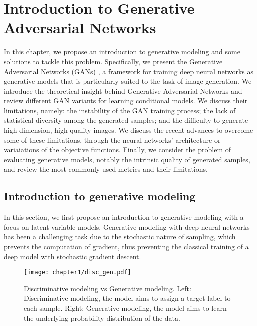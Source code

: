 \chapter{Introduction to Generative Adversarial Networks }
\label{chap:chapter1}

\begin{chapterabstract}
	In this chapter, we propose an introduction to generative modeling and some solutions to tackle this problem. Specifically, we present the Generative Adversarial Networks (\ac{GANs}) \citep{Goodfellow2014}, a framework for training deep neural networks as generative models that is particularly suited to the task of image generation. We introduce the theoretical insight behind Generative Adversarial Networks and review different \ac{GAN} variants for learning conditional models. We discuss their limitations, namely: the instability of the \ac{GAN} training process; the lack of statistical diversity among the generated samples; and the difficulty to generate high-dimension, high-quality images. We discuss the recent advances to overcome some of these limitations, through the neural networks' architecture or variaiations of the objective functions. Finally,  we consider the problem of evaluating generative models, notably the intrinsic quality of generated samples, and review the most commonly used metrics and their limitations. 
\end{chapterabstract}

\clearpage\minitoc


\section{Introduction to generative modeling}

In this section, we first propose an introduction to generative modeling with a focus on latent variable models.  Generative modeling with deep neural networks has been a challenging task due to the stochastic nature of sampling, which prevents the computation of gradient, thus preventing the classical training of a deep model with stochastic gradient descent. 

\begin{figure}
	\centering
	\texttt{[image: chapter1/disc\_gen.pdf]}
	\caption[Generative modeling]{Discriminative modeling vs Generative modeling. Left: Discriminative modeling, the model aims to assign a target label to each sample. Right: Generative modeling, the model aims to learn the underlying probability distribution of the data.}
	\label{fig:disc_gen}
\end{figure}


